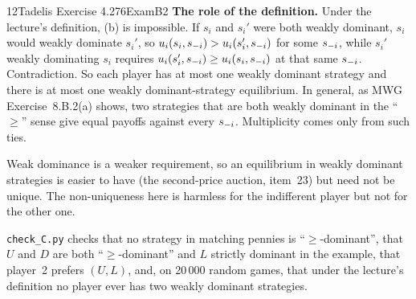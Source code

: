 \begin{exsol}{12}{Tadelis Exercise 4.2}{76}{Exam}{B2}
\textbf{The role of the definition.} Under the lecture's definition, (b) is impossible. If
$s_i$ and $s_i'$ were both weakly dominant, $s_i$ would weakly dominate $s_i'$, so
$u_i(s_i, s_{-i}) > u_i(s_i', s_{-i})$ for some $s_{-i}$, while $s_i'$ weakly dominating $s_i$ requires
$u_i(s_i', s_{-i}) \ge u_i(s_i, s_{-i})$ at that same $s_{-i}$. Contradiction. So each player has at most
one weakly dominant strategy and there is at most one weakly dominant-strategy equilibrium. In
general, as MWG Exercise~8.B.2(a) shows, two strategies that are both weakly dominant in the
``$\ge$'' sense give equal payoffs against every $s_{-i}$. Multiplicity comes only from such ties.

\interp Weak dominance is a weaker requirement, so an equilibrium in weakly dominant
strategies is easier to have (the second-price auction, item~23) but need not be unique. The
non-uniqueness here is harmless for the indifferent player but not for the other one.

\verify \texttt{check\_C.py} checks that no strategy in matching pennies is ``$\ge$-dominant'',
that $U$ and $D$ are both ``$\ge$-dominant'' and $L$ strictly dominant in the example, that player~2
prefers $(U,L)$, and, on 20\,000 random games, that under the lecture's definition no player ever
has two weakly dominant strategies.

\end{exsol}
